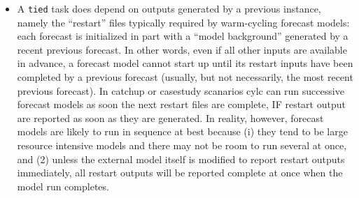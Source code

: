 \documentclass[11pt,a4paper]{article}
\begin{document}
\begin{itemize}
    \item A \lstinline=tied= task does depend on outputs
        generated by a previous instance, namely the ``restart''
        files typically required by warm-cycling forecast models:
        each forecast is initialized in part with a ``model
        background'' generated by a recent previous forecast.
        In other words, even if all other inputs are available 
        in advance, a forecast model cannot start up until its
        restart inputs have been completed by a previous forecast
        (usually, but not necessarily, the most recent previous
        forecast). In catchup or casestudy scanarios cylc can run
        successive forecast models as soon the next restart files
        are complete, IF restart output are reported as soon as they are
        generated. In reality, however, forecast models are likely
        to run in sequence at best because (i) they tend to be large
        resource intensive models and there may not be room to run
        several at once, and (2) unless the external model itself 
        is modified to report restart outputs immediately, all 
        restart outputs will be reported complete at once when the
        model run completes.
 
\end{itemize}
\end{document}
